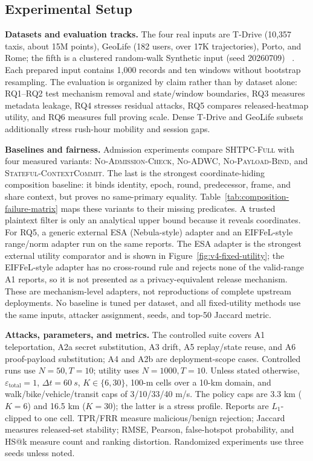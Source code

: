 \documentclass[journal]{IEEEtran}
\theoremstyle{definition}
\theoremstyle{plain}
\begin{document}
\subsection{Experimental Setup}
\label{sec:setup}

\noindent\textbf{Datasets and evaluation tracks.}
The four real inputs are T-Drive (10,357 taxis, about 15M points), GeoLife
(182 users, over 17K trajectories), Porto, and Rome; the fifth is a clustered
random-walk Synthetic input (seed 20260709)
~\cite{Yuan2010Tdrive,Yuan2011Driving,Zheng2008Understanding,Zheng2009Mining,
Zheng2010GeoLife,MoreiraMatias2015Porto,Bracciale2014Rome}. Each prepared input
contains 1,000 records and ten windows without bootstrap resampling. The
evaluation is organized by claim rather than by dataset alone: RQ1--RQ2 test
mechanism removal and state/window boundaries, RQ3 measures metadata leakage,
RQ4 stresses residual attacks, RQ5 compares released-heatmap utility, and RQ6
measures full proving scale. Dense T-Drive and GeoLife subsets additionally
stress rush-hour mobility and session gaps.

\noindent\textbf{Baselines and fairness.}
Admission experiments compare \textsc{SHTPC-Full} with four measured variants:
\textsc{No-Admission-Check}, \textsc{No-ADWC},
\textsc{No-Payload-Bind}, and \textsc{Stateful-ContextCommit}. The last is the
strongest coordinate-hiding composition baseline: it binds identity, epoch,
round, predecessor, frame, and share context, but proves no same-primary
equality. Table~\ref{tab:composition-failure-matrix} maps these variants to
their missing predicates. A trusted plaintext filter is only an analytical
upper bound because it reveals coordinates. For RQ5, a generic external ESA
(Nebula-style) adapter and an EIFFeL-style range/norm adapter run on the same
reports. The ESA adapter is the strongest external utility comparator and is
shown in Figure~\ref{fig:v4-fixed-utility}; the EIFFeL-style adapter has no
cross-round rule and rejects none of the valid-range A1 reports, so it is not
presented as a privacy-equivalent release mechanism. These are mechanism-level
adapters, not reproductions of complete upstream deployments. No baseline is
tuned per dataset, and all fixed-utility methods use the same inputs, attacker
assignment, seeds, and top-50 Jaccard metric.

\noindent\textbf{Attacks, parameters, and metrics.}
The controlled suite covers A1 teleportation, A2a secret substitution, A3
drift, A5 replay/state reuse, and A6 proof-payload substitution; A4 and A2b are
deployment-scope cases. Controlled runs use \(N=50,T=10\); utility uses
\(N=1000,T=10\). Unless stated otherwise,
\(\varepsilon_{\mathrm{total}}=1\), \(\Delta t=\SI{60}{s}\),
\(K\in\{6,30\}\), 100-m cells over a 10-km domain, and walk/bike/vehicle/transit
caps of 3/10/33/40 m/s. The policy caps are 3.3 km (\(K=6\)) and 16.5 km
(\(K=30\)); the latter is a stress profile. Reports are \(L_1\)-clipped to one
cell. TPR/FRR measure malicious/benign rejection; Jaccard measures released-set
stability; RMSE, Pearson, false-hotspot probability, and HS@k measure count and
ranking distortion. Randomized experiments use three seeds unless noted.
\end{document}
